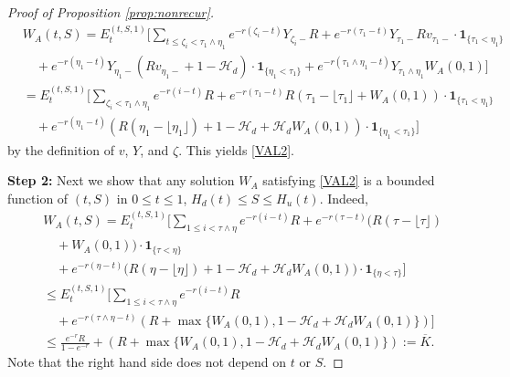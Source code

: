 \documentclass[draft, noinfoline]{ectaart}
\numberwithin{equation}{section}
\theoremstyle{plain}
\begin{document}
\begin{appendices}
\begin{proof}[Proof of Proposition \ref{prop:nonrecur}]
	\begin{align*}
	&W_A(t,S)=E_t^{(t,S,1)}\Bigg[\sum_{t\le\zeta_i<\tau_1\land\eta_1}e^{-r(\zeta_i-t)}Y_{\zeta_i-}R+e^{-r(\tau_1-t)}Y_{\tau_1-}Rv_{\tau_1-}\cdot\mathbf{1}_{\{\tau_1<\eta_1\}}\\
	&\quad+e^{-r(\eta_1-t)}Y_{\eta_1-}(Rv_{\eta_1-}+1-\mathcal{H}_d)\cdot\mathbf{1}_{\{\eta_1<\tau_1\}}+e^{-r(\tau_1\land\eta_1-t)}Y_{\tau_1\land\eta_1}W_A(0,1)\Bigg]\\
	&=E_t^{(t,S,1)}\Bigg[\sum_{\zeta_i<\tau_1\land\eta_1}e^{-r(i-t)}R+e^{-r(\tau_1-t)}R(\tau_1-\lfloor\tau_1\rfloor+W_A(0,1))\cdot\mathbf{1}_{\{\tau_1<\eta_1\}}\\
	&\quad+e^{-r(\eta_1-t)}(R(\eta_1-\lfloor\eta_1\rfloor)+1-\mathcal{H}_d+\mathcal{H}_d W_A(0,1))\cdot\mathbf{1}_{\{\eta_1<\tau_1\}}\Bigg]
	\end{align*}
	by the definition of $v$, $Y$, and $\zeta$. This yields \eqref{VAL2}.
	
	{\flushleft\bf Step 2:} Next we show that any solution $W_A$ satisfying \eqref{VAL2} is a bounded function of $(t,S)$ in $0\le t\le 1$, $H_d(t)\le S\le H_u(t)$. Indeed,
	\begin{align*}
	&W_A(t,S)=E_t^{(t,S,1)}\Bigg[\sum_{1\le i< \tau\land\eta}e^{-r(i-t)}R+e^{-r(\tau-t)} \Bigg( R(\tau-\lfloor\tau\rfloor)  \\
	&\quad+W_A(0,1))\cdot\mathbf{1}_{\{\tau<\eta\}} \\
	&\quad   +e^{-r(\eta-t)}(R(\eta-\lfloor\eta\rfloor)+1-\mathcal{H}_d+\mathcal{H}_d W_A(0,1) \Bigg) \cdot \mathbf{1}_{\{\eta<\tau\}}\Bigg]\\
	&\le E_t^{(t,S,1)}\Bigg[\sum_{1\le i< \tau\land\eta}e^{-r(i-t)}R   \\
	&\quad +e^{-r(\tau\land\eta-t)}(R+\max\{W_A(0,1),1-\mathcal{H}_d+\mathcal{H}_d W_A(0,1)\})\Bigg]\\
	&\le \frac{e^{-r}R}{1-e^{-r}}+(R+\max\{W_A(0,1),1-\mathcal{H}_d+\mathcal{H}_d W_A(0,1)\}):=\overline{K}.
	\end{align*}
	Note that the right hand side does not depend on $t$ or $S$.
	

\end{proof}
\end{appendices}
\end{document}
